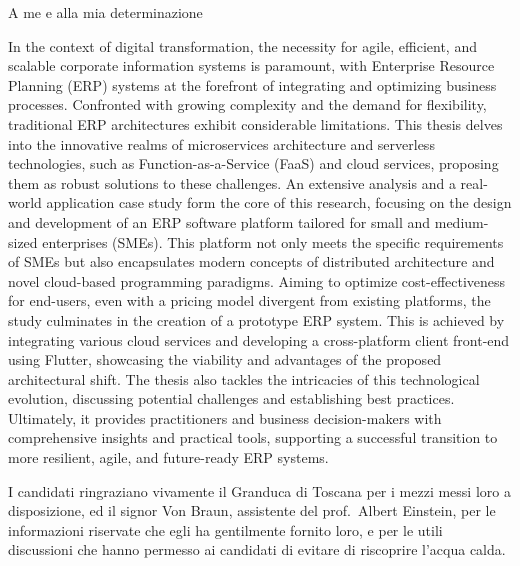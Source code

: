 \documentclass[%
	corpo=11pt,
    twoside,
    stile=classica,
    oldstyle,
    tipotesi=custom,
    greek,
    evenboxes,
]{toptesi}
\begin{document}
\english


\ifclassica%
\begin{dedica}
    A me e alla mia determinazione
\end{dedica}

\sommario%
In the context of digital transformation, the necessity for agile, efficient, and scalable corporate information systems is paramount, with Enterprise Resource Planning (ERP) systems at the forefront of integrating and optimizing business processes. Confronted with growing complexity and the demand for flexibility, traditional ERP architectures exhibit considerable limitations. This thesis delves into the innovative realms of microservices architecture and serverless technologies, such as Function-as-a-Service (FaaS) and cloud services, proposing them as robust solutions to these challenges. An extensive analysis and a real-world application case study form the core of this research, focusing on the design and development of an ERP software platform tailored for small and medium-sized enterprises (SMEs). This platform not only meets the specific requirements of SMEs but also encapsulates modern concepts of distributed architecture and novel cloud-based programming paradigms. Aiming to optimize cost-effectiveness for end-users, even with a pricing model divergent from existing platforms, the study culminates in the creation of a prototype ERP system. This is achieved by integrating various cloud services and developing a cross-platform client front-end using Flutter, showcasing the viability and advantages of the proposed architectural shift. The thesis also tackles the intricacies of this technological evolution, discussing potential challenges and establishing best practices. Ultimately, it provides practitioners and business decision-makers with comprehensive insights and practical tools, supporting a successful transition to more resilient, agile, and future-ready ERP systems.


\ringraziamenti%
I candidati ringraziano vivamente il Granduca di Toscana per i mezzi messi loro a disposizione, ed il signor Von Braun, assistente del prof.~Albert Einstein, per le informazioni riservate che egli ha gentilmente fornito loro, e per le utili discussioni che hanno permesso ai candidati di evitare di riscoprire l'acqua calda.
\end{document}
